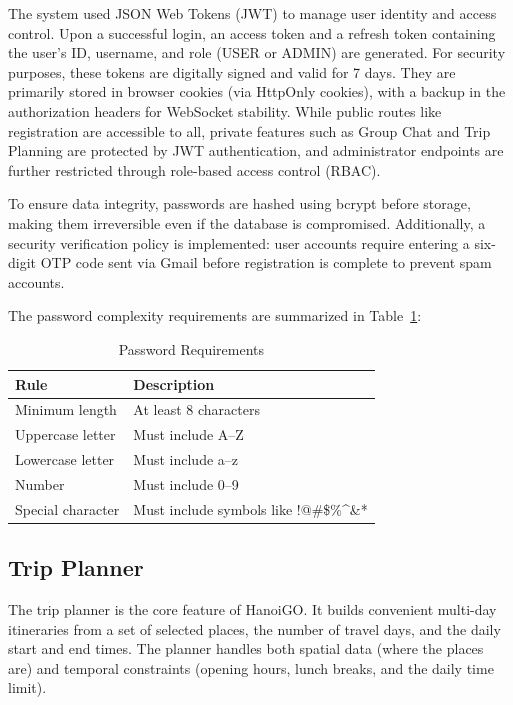\documentclass[a4paper,12pt]{report}
\begin{document}
The system used JSON Web Tokens (JWT) to manage user identity and access control. Upon a successful login, an access token and a refresh token containing the user's ID, username, and role (USER or ADMIN) are generated. For security purposes, these tokens are digitally signed and valid for 7 days. They are primarily stored in browser cookies (via HttpOnly cookies), with a backup in the authorization headers for WebSocket stability. While public routes like registration are accessible to all, private features such as Group Chat and Trip Planning are protected by JWT authentication, and administrator endpoints are further restricted through role-based access control (RBAC).

To ensure data integrity, passwords are hashed using bcrypt before storage, making them irreversible even if the database is compromised. Additionally, a security verification policy is implemented: user accounts require entering a six-digit OTP code sent via Gmail before registration is complete to prevent spam accounts.

The password complexity requirements are summarized in Table~\ref{tab:password_rules}:

\begin{table}[H]
\centering
\begin{tabular}{|p{4cm}|p{9cm}|}
\hline
\textbf{Rule} & \textbf{Description} \\
\hline
Minimum length & At least 8 characters \\
\hline
Uppercase letter & Must include A--Z \\
\hline
Lowercase letter & Must include a--z \\
\hline
Number & Must include 0--9 \\
\hline
Special character & Must include symbols like !@\#\$\%\^{}\&* \\
\hline
\end{tabular}
\caption{Password Requirements}
\label{tab:password_rules}
\end{table}


\subsection{Trip Planner}

The trip planner is the core feature of HanoiGO. It builds convenient multi-day itineraries from a set of selected places, the number of travel days, and the daily start and end times. The planner handles both spatial data (where the places are) and temporal constraints (opening hours, lunch breaks, and the daily time limit). 
\end{document}
